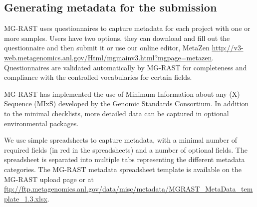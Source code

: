 \documentclass[12pt,fullpage]{report}
\begin{document}


\subsection{Generating metadata for the submission}
\label{section:generating_metadata}

MG-RAST uses questionnaires to capture metadata for each project with one or more samples. Users have two options, they can download and fill out the questionnaire and then submit it or use our online editor, MetaZen \url{
http://v3-web.metagenomics.anl.gov/Html/mgmainv3.html?mgpage=metazen}.
Questionnaires are validated automatically by MG-RAST for completeness and compliance with the controlled vocabularies for certain fields.


MG-RAST has implemented the use of Minimum Information about any (X) Sequence (MIxS)\cite{MIENS} developed by the Genomic Standards Consortium. In addition to the minimal checklists, more detailed data can be captured in optional environmental packages.

We use simple spreadsheets to capture metadata, with a minimal number of required fields (in red in the spreadsheets) and a number of optional fields. The spreadsheet is separated into multiple tabs representing the different metadata categories. The MG-RAST metadata spreadsheet template is available on the MG-RAST upload page or at \url{ftp://ftp.metagenomics.anl.gov/data/misc/metadata/MGRAST_MetaData_template_1.3.xlsx}.
\end{document}
